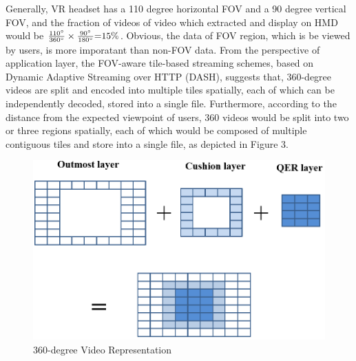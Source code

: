 



	Generally, VR headset has a 110 degree horizontal FOV and a 90 degree vertical FOV, and the fraction of videos of video which extracted and display on HMD would be $\frac{{110^\circ }}{{360^\circ }} \times \frac{{90^\circ }}{{180^\circ }}{\rm{ = }}15{\rm{\% }}$. Obvious, the data of FOV region, which is be viewed by users, is more imporatant than non-FOV data.
	From the perspective of application layer, the FOV-aware tile-based streaming schemes, based on Dynamic Adaptive Streaming over HTTP (DASH), suggests that, 360-degree videos are split and encoded into multiple tiles spatially, each of which can be independently decoded, stored into a single file. Furthermore, according to the distance from the expected viewpoint of users, 360 videos would be split into two or three regions spatially, each of which would be composed of multiple contiguous tiles and store into a single file, as depicted in Figure 3.
	
	\begin{figure}[ht]
		\centering
		\includegraphics[scale=0.2]{paper_figs/tileSplit.png}
		\caption{360-degree Video Representation}
		\label{paper_figs:pathdemo}
	\end{figure}	
	
